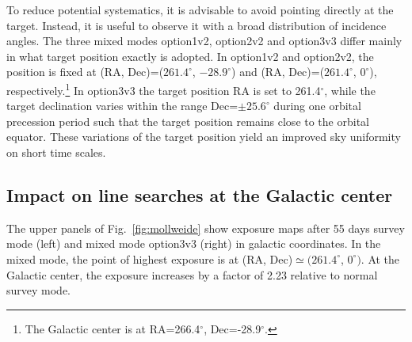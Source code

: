 \documentclass[aps,prd,superscriptaddress,nofootinbib,fixlfloat, 12pt]{revtex4-1}
\begin{document}
To reduce potential systematics, it is advisable to avoid pointing directly at
the target. Instead, it is useful to observe it with a broad distribution of
incidence angles. The three mixed modes option1v2, option2v2
and option3v3 differ mainly in what target position exactly is adopted.
In option1v2 and option2v2, the position is fixed at (RA,
Dec)=($261.4^\circ$, $-28.9^\circ$) and (RA, Dec)=($261.4^\circ$, $0^\circ$),
respectively.\footnote{The Galactic center is at RA=266.4$^\circ$,
Dec=-28.9$^\circ$.}  In option3v3 the target position RA is set to
261.4$^\circ$, while the target declination varies within the
range Dec=$\pm25.6^\circ$ during one orbital precession period such that the
target position remains close to the orbital equator.  These variations of the target
position yield an improved sky uniformity on short time scales. 

\subsection{Impact on line searches at the Galactic center}
The upper panels of Fig.~\ref{fig:mollweide} show exposure maps after 55 days
survey mode (left) and mixed mode option3v3 (right) in galactic
coordinates.  In the mixed mode, the point of highest exposure is at (RA,
Dec)$\simeq(261.4^\circ$, $0^\circ)$. At the Galactic center, the exposure increases by a
factor of 2.23 relative to normal survey mode.
\end{document}
